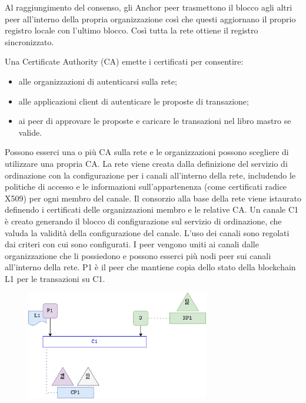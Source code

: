 Al raggiungimento del consenso, gli Anchor peer trasmettono il blocco agli altri peer all'interno della propria organizzazione così che questi aggiornano il proprio registro locale con l'ultimo blocco. Così tutta la rete ottiene il registro sincronizzato.

\vspace{5mm}

Una Certificate Authority (CA) emette i certificati per consentire:
\begin{itemize}
    \item alle organizzazioni di autenticarsi sulla rete;
    \item alle applicazioni client di autenticare le proposte di transazione;
    \item ai peer di approvare le proposte e caricare le transazioni nel libro mastro se valide.
\end{itemize}

Possono esserci una o più CA sulla rete e le organizzazioni possono scegliere di utilizzare una propria CA. La rete viene creata dalla definizione del servizio di ordinazione con la configurazione per i canali all'interno della rete, includendo le politiche di accesso e le informazioni sull'appartenenza (come certificati radice X509) per ogni membro del canale. Il consorzio alla base della rete viene istaurato definendo i certificati delle organizzazioni membro e le relative CA. Un canale C1 è creato generando il blocco di configurazione sul servizio di ordinazione, che valuda la validità della configurazione del canale. L'uso dei canali sono regolati dai criteri con cui sono configurati. I peer vengono uniti ai canali dalle organizzazione che li possiedono e possono esserci più nodi peer sui canali all'interno della rete. P1 è il peer che mantiene copia dello stato della blockchain L1 per le transazioni su C1.

\begin{figure}[htb!]
    \centering
    \includegraphics[width=8cm]{./Images/cap3/3.15.png}
\end{figure}

